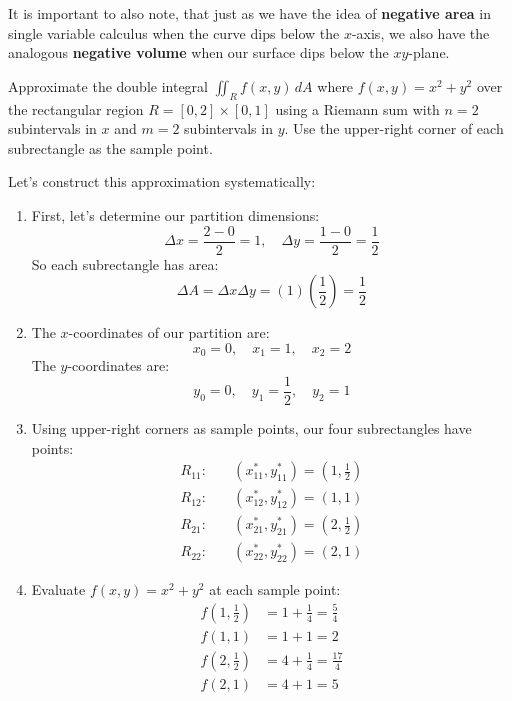 \noindent It is important to also note, that just as we have the idea of \textbf{negative area} in single variable calculus when the curve dips below the $x$-axis, we also have the analogous \textbf{negative volume} when our surface dips below the $xy$-plane.

\exampleline
\begin{example}
Approximate the double integral \(\iint_R f(x,y)\,dA\) where \(f(x,y) = x^2 + y^2\) over the rectangular region \(R = [0,2] \times [0,1]\) using a Riemann sum with \(n = 2\) subintervals in $x$ and \(m = 2\) subintervals in $y$. Use the upper-right corner of each subrectangle as the sample point.

\begin{solution}
Let's construct this approximation systematically:

\begin{enumerate}
\item First, let's determine our partition dimensions:
    \[
    \Delta x = \frac{2-0}{2} = 1, \quad \Delta y = \frac{1-0}{2} = \frac{1}{2}
    \]
    So each subrectangle has area:
    \[
    \Delta A = \Delta x \Delta y = (1)\left(\frac{1}{2}\right) = \frac{1}{2}
    \]

\item The $x$-coordinates of our partition are:
    \[
    x_0 = 0, \quad x_1 = 1, \quad x_2 = 2
    \]
    The $y$-coordinates are:
    \[
    y_0 = 0, \quad y_1 = \frac{1}{2}, \quad y_2 = 1
    \]

\item Using upper-right corners as sample points, our four subrectangles have points:
    \begin{align*}
    R_{11}: &\quad (x_{11}^*, y_{11}^*) = \left(1, \frac{1}{2}\right) \\
    R_{12}: &\quad (x_{12}^*, y_{12}^*) = \left(1, 1\right) \\
    R_{21}: &\quad (x_{21}^*, y_{21}^*) = \left(2, \frac{1}{2}\right) \\
    R_{22}: &\quad (x_{22}^*, y_{22}^*) = \left(2, 1\right)
    \end{align*}

\item Evaluate \(f(x,y) = x^2 + y^2\) at each sample point:
    \begin{align*}
    f\left(1, \frac{1}{2}\right) &= 1 + \frac{1}{4} = \frac{5}{4} \\
    f(1, 1) &= 1 + 1 = 2 \\
    f\left(2, \frac{1}{2}\right) &= 4 + \frac{1}{4} = \frac{17}{4} \\
    f(2, 1) &= 4 + 1 = 5
    \end{align*}


\end{enumerate}
\end{solution}
\end{example}
